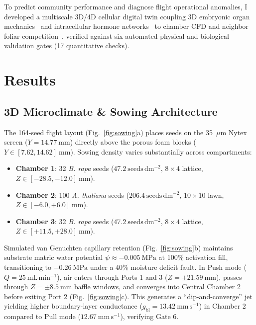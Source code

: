 \documentclass[10pt,twocolumn,twoside]{article}
\begin{document}
To predict community performance and diagnose flight operational anomalies, I developed a multiscale 3D/4D cellular digital twin coupling 3D embryonic organ mechanics~\cite{bassel2014,lockhart1965} and intracellular hormone networks~\cite{abley2021,topham2017} to chamber CFD and neighbor foliar competition~\cite{ballare2017}, verified against six automated physical and biological validation gates (17 quantitative checks).

\section*{Results}

\subsection*{3D Microclimate \& Sowing Architecture}

The 164-seed flight layout (Fig.~\ref{fig:sowing}a) places seeds on the 35~$\mu$m Nytex screen ($Y = 14.77\ \mathrm{mm}$) directly above the porous foam blocks ($Y \in [7.62, 14.62]\ \mathrm{mm}$). Sowing density varies substantially across compartments:
\begin{itemize}
    \item \textbf{Chamber 1}: 32 \textit{B. rapa} seeds ($47.2\ \mathrm{seeds\,dm^{-2}}$, $8 \times 4$ lattice, $Z \in [-28.5, -12.0]\ \mathrm{mm}$).
    \item \textbf{Chamber 2}: 100 \textit{A. thaliana} seeds ($206.4\ \mathrm{seeds\,dm^{-2}}$, $10 \times 10$ lawn, $Z \in [-6.0, +6.0]\ \mathrm{mm}$).
    \item \textbf{Chamber 3}: 32 \textit{B. rapa} seeds ($47.2\ \mathrm{seeds\,dm^{-2}}$, $8 \times 4$ lattice, $Z \in [+11.5, +28.0]\ \mathrm{mm}$).
\end{itemize}

Simulated van Genuchten capillary retention (Fig.~\ref{fig:sowing}b) maintains substrate matric water potential $\psi \approx -0.005\ \mathrm{MPa}$ at 100\% activation fill, transitioning to $-0.26\ \mathrm{MPa}$ under a 40\% moisture deficit fault. In Push mode ($Q = 25\ \mathrm{mL\,min^{-1}}$), air enters through Ports 1 and 3 ($Z = \pm 21.59\ \mathrm{mm}$), passes through $Z = \pm 8.5\ \mathrm{mm}$ baffle windows, and converges into Central Chamber 2 before exiting Port 2 (Fig.~\ref{fig:sowing}c). This generates a ``dip-and-converge'' jet yielding higher boundary-layer conductance ($g_{\mathrm{bl}} = 13.42\ \mathrm{mm\,s^{-1}}$) in Chamber 2 compared to Pull mode ($12.67\ \mathrm{mm\,s^{-1}}$), verifying Gate 6.
\end{document}
